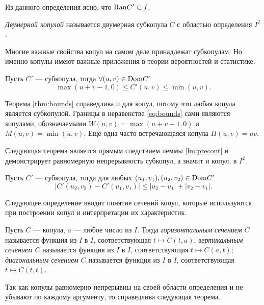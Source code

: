 Из данного определения ясно, что $\mathrm{Ran}{C'} \subset I$.

\begin{define}
	\emph{Двумерной копулой} называется двумерная субкопула $C$ с областью определения $I^2$.
\end{define}

Многие важные свойства копул на самом деле принадлежат субкопулам. Но именно копулы имеют важные приложения в теории вероятностей и статистике.

\begin{theorem}\label{thm:bounds}
	Пусть $C'$ --- субкопула, тогда $\forall (u, v) \in \mathrm{Dom}{C'}$
	\begin{equation}\label{eq:bounds}
		\max (u + v - 1, 0) \leqslant C'(u, v) \leqslant \min (u, v).
	\end{equation}
\end{theorem}

Теорема \ref{thm:bounds} справедлива и для копул, потому что любая копула является субкопулой. Границы в неравенстве \eqref{eq:bounds} сами являются копулами, обозначаемыми $W(u, v) = \max (u + v - 1, 0)$ и $M(u, v) = \min (u, v)$. Ещё одна часто встречающаяся копула $\Pi(u, v) = uv$.

Следующая теорема является прямым следствием леммы \ref{lm:precont} и демонстрирует равномерную непрерывность субкопул, а значит и копул, в $I^2$.

\begin{theorem}\label{thm:cont}
	Пусть $C'$ --- субкопула, тогда для любых $(u_1, v_1), (u_2, v_2) \in \mathrm{Dom}{C'}$
\[
|C'(u_2, v_2) - C'(u_1, v_1)| \leqslant |u_2 - u_1| + |v_2 - v_1|.
\]
\end{theorem}

Следующее определение вводит понятие сечений копул, которые используются при построении копул и интерпретации их характеристик.

\begin{define}
	Пусть $C$ --- копула, $a$ --- любое число из $I$. Тогда \emph{горизонтальным сечением} $C$ называется функция из $I$ в $I$, соответствующая $t \mapsto C(t, a)$; \emph{вертикальным сечением} $C$ называется функция из $I$ в $I$, соответствующая $t \mapsto C(a, t)$; \emph{диагональным сечением} $C$ называется функция из $I$ в $I$, соответствующая $t \mapsto C(t, t)$.
\end{define}

Так как копулы равномерно непрерывны на своей области определения и не убывают по каждому аргументу, то справедлива следующая теорема.

